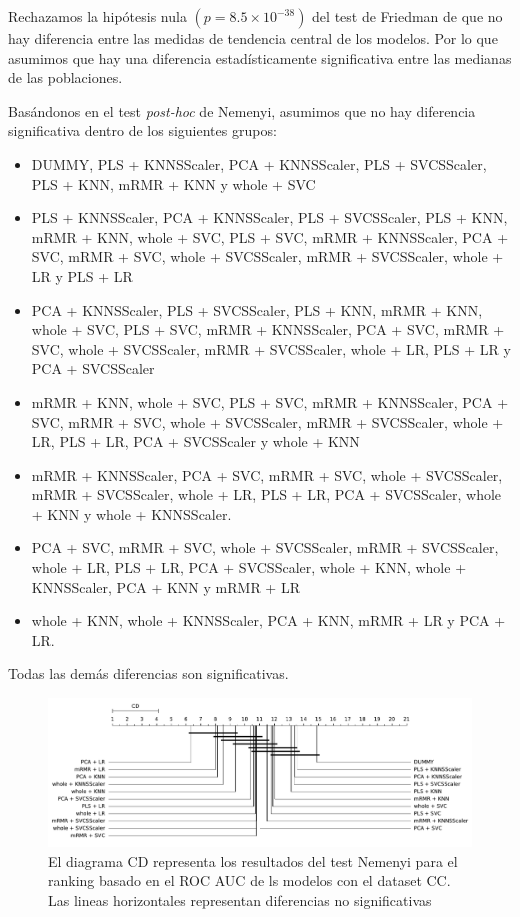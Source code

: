 \documentclass[a4paper,oneside,11pt,leqno]{article}
\begin{document}
	Rechazamos la hipótesis nula $(p=8.5\times 10^{-38})$ del test de Friedman de que no hay diferencia entre las medidas de tendencia central de los modelos. Por lo que asumimos que hay una diferencia estadísticamente significativa entre las medianas de las poblaciones. 
	
	Basándonos en el test \textit{post-hoc} de Nemenyi, asumimos que no hay diferencia significativa dentro de los siguientes grupos:
	
	\begin{itemize}
		\item DUMMY, PLS + KNNSScaler, PCA + KNNSScaler, PLS + SVCSScaler, PLS + KNN, mRMR + KNN y whole + SVC
		
		
		\item PLS + KNNSScaler, PCA + KNNSScaler, PLS + SVCSScaler, PLS + KNN, mRMR + KNN, whole + SVC, PLS + SVC, mRMR + KNNSScaler, PCA + SVC, mRMR + SVC, whole + SVCSScaler, mRMR + SVCSScaler, whole + LR y PLS + LR
		
		\item PCA + KNNSScaler, PLS + SVCSScaler, PLS + KNN, mRMR + KNN, whole + SVC, PLS + SVC, mRMR + KNNSScaler, PCA + SVC, mRMR + SVC, whole + SVCSScaler, mRMR + SVCSScaler, whole + LR, PLS + LR y PCA + SVCSScaler
		
		\item mRMR + KNN, whole + SVC, PLS + SVC, mRMR + KNNSScaler, PCA + SVC, mRMR + SVC, whole + SVCSScaler, mRMR + SVCSScaler, whole + LR, PLS + LR, PCA + SVCSScaler y whole + KNN
		
		\item  mRMR + KNNSScaler, PCA + SVC, mRMR + SVC, whole + SVCSScaler, mRMR + SVCSScaler, whole + LR, PLS + LR, PCA + SVCSScaler, whole + KNN y whole + KNNSScaler.
		
		\item  PCA + SVC, mRMR + SVC, whole + SVCSScaler, mRMR + SVCSScaler, whole + LR, PLS + LR, PCA + SVCSScaler, whole + KNN, whole + KNNSScaler, PCA + KNN y mRMR + LR
		
		\item  whole + KNN, whole + KNNSScaler, PCA + KNN, mRMR + LR y PCA + LR. 
	\end{itemize}
	
	Todas las demás diferencias son significativas.
	 
	\begin{figure}[h]
		\includegraphics[width=\linewidth]{stat_results_cc.pdf}
		\caption{El diagrama CD representa los resultados del test Nemenyi para el ranking basado en el ROC AUC de ls modelos con el dataset CC. Las lineas horizontales representan diferencias no significativas}
		\label{fig:stats_fig_cc}
	\end{figure}
\end{document}
